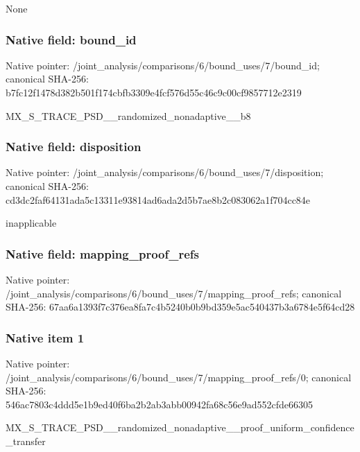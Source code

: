 \documentclass[10pt,a4paper]{article}
\begin{document}
\begingroup\raggedright\sloppy None\par\endgroup

\subsubsection{Native field: bound\_\allowbreak{}id}
Native pointer: /joint\_\allowbreak{}analysis/comparisons/6/bound\_\allowbreak{}uses/7/bound\_\allowbreak{}id; canonical SHA-256: b7fc12f1478d382b501f174cbfb3309e4fcf576d55c46c9c00cf9857712e2319

\begingroup\raggedright\sloppy MX\_\allowbreak{}S\_\allowbreak{}TRACE\_\allowbreak{}PSD\_\allowbreak{}\_\allowbreak{}randomized\_\allowbreak{}nonadaptive\_\allowbreak{}\_\allowbreak{}b8\par\endgroup

\subsubsection{Native field: disposition}
Native pointer: /joint\_\allowbreak{}analysis/comparisons/6/bound\_\allowbreak{}uses/7/disposition; canonical SHA-256: cd3dc2faf64131ada5c13311e93814ad6ada2d5b7ae8b2c083062a1f704cc84e

\begingroup\raggedright\sloppy inapplicable\par\endgroup

\subsubsection{Native field: mapping\_\allowbreak{}proof\_\allowbreak{}refs}
Native pointer: /joint\_\allowbreak{}analysis/comparisons/6/bound\_\allowbreak{}uses/7/mapping\_\allowbreak{}proof\_\allowbreak{}refs; canonical SHA-256: 67aa6a1393f7c376ea8fa7c4b5240b0b9bd359e5ac540437b3a6784e5f64cd28

\subsubsection{Native item 1}
Native pointer: /joint\_\allowbreak{}analysis/comparisons/6/bound\_\allowbreak{}uses/7/mapping\_\allowbreak{}proof\_\allowbreak{}refs/0; canonical SHA-256: 546ac7803c4ddd5e1b9ed40f6ba2b2ab3abb00942fa68c56e9ad552cfde66305

\begingroup\raggedright\sloppy MX\_\allowbreak{}S\_\allowbreak{}TRACE\_\allowbreak{}PSD\_\allowbreak{}\_\allowbreak{}randomized\_\allowbreak{}nonadaptive\_\allowbreak{}\_\allowbreak{}proof\_\allowbreak{}uniform\_\allowbreak{}confidence\_\allowbreak{}transfer\par\endgroup
\end{document}
